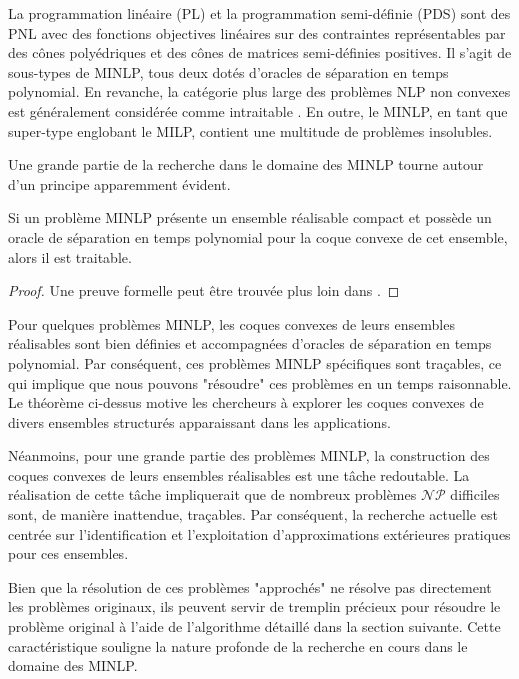     La programmation linéaire (PL) et la programmation semi-définie (PDS) sont des PNL avec des fonctions objectives linéaires sur des contraintes représentables par des cônes polyédriques et des cônes de matrices semi-définies positives. Il s'agit de sous-types de 
    MINLP, tous deux dotés d'oracles de séparation en temps polynomial. En revanche, la catégorie plus large des problèmes NLP non convexes est généralement considérée comme intraitable \cite{liberti2019undecidability}. En outre, le MINLP, en tant que super-type englobant le MILP, contient une multitude de problèmes insolubles.
   
   Une grande partie de la recherche dans le domaine des MINLP tourne autour d'un principe apparemment évident.
   
   \begin{theorem}
   Si un problème MINLP présente un ensemble réalisable compact et possède un oracle de séparation en temps polynomial pour la coque convexe de cet ensemble, alors il est traitable.    
   \end{theorem}
   \begin{proof}
       Une preuve formelle peut être trouvée plus loin dans .
   \end{proof}
   
   
   Pour quelques problèmes MINLP, les coques convexes de leurs ensembles réalisables sont bien définies et accompagnées d'oracles de séparation en temps polynomial. Par conséquent, ces problèmes MINLP spécifiques sont traçables, ce qui implique que nous pouvons "résoudre" ces problèmes en un temps raisonnable. Le théorème ci-dessus motive les chercheurs à explorer les coques convexes de divers ensembles structurés apparaissant dans les applications. 
   
   Néanmoins, pour une grande partie des problèmes MINLP, la construction des coques convexes de leurs ensembles réalisables est une tâche redoutable. La réalisation de cette tâche impliquerait que de nombreux problèmes $\mathcal{NP}$ difficiles sont, de manière inattendue, traçables. Par conséquent, la recherche actuelle est centrée sur l'identification et l'exploitation d'approximations extérieures pratiques pour ces ensembles.
   
   Bien que la résolution de ces problèmes "approchés" ne résolve pas directement les problèmes originaux, ils peuvent servir de tremplin précieux pour résoudre le problème original à l'aide de l'algorithme détaillé dans la section suivante. Cette caractéristique souligne la nature profonde de la recherche en cours dans le domaine des MINLP.

